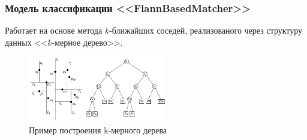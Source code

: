\documentclass[t]{beamer}
\begin{document}
	\begin{frame}
		\frametitle{Модель классификации <<FlannBasedMatcher>>}
		
		Работает на основе метода $k$-ближайших соседей, реализованого через структуру данных <<$k$-мерное дерево>>.
		\vspace{0.65cm}
		\begin{figure}[h!]
			\centering
			\includegraphics[width = 6cm]{image/chapter_2/kdtreeexample}	
			\caption{Пример построения k-мерного дерева}
			\label{fig:kdtreeexample}
		\end{figure}
	\end{frame}
	
\end{document}
